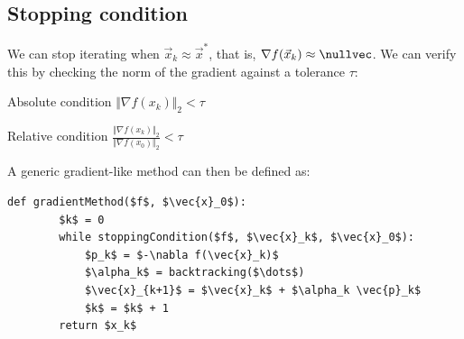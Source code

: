 \subsection{Stopping condition}
We can stop iterating when $\vec{x}_k \approx \vec{x}^*$, that is, $\nabla f(\vec{x}_k) \approx \nullvec$.
We can verify this by checking the norm of the gradient against a tolerance $\tau$:
\begin{descriptionlist}
    \item[Absolute condition] $\Vert \nabla f(x_k) \Vert_2 < \tau$ 
    \item[Relative condition] $\frac{\Vert \nabla f(x_k) \Vert_2}{\Vert \nabla f(x_0) \Vert_2} < \tau$ 
\end{descriptionlist}

A generic gradient-like method can then be defined as:
\begin{lstlisting}[mathescape=true]
    def gradientMethod($f$, $\vec{x}_0$):
        $k$ = 0
        while stoppingCondition($f$, $\vec{x}_k$, $\vec{x}_0$):
            $p_k$ = $-\nabla f(\vec{x}_k)$
            $\alpha_k$ = backtracking($\dots$)
            $\vec{x}_{k+1}$ = $\vec{x}_k$ + $\alpha_k \vec{p}_k$
            $k$ = $k$ + 1
        return $x_k$
\end{lstlisting}